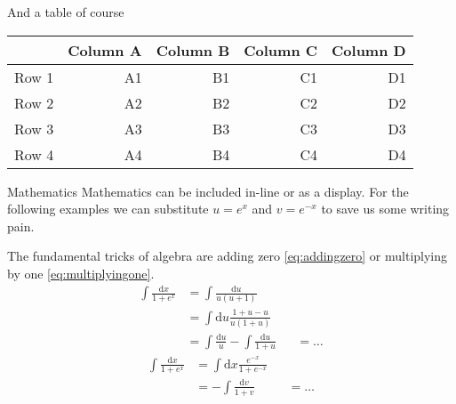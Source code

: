 \documentclass[final]{beamer}
\newcommand{\diff}{\mathrm{d}} %
\begin{document}
\begin{frame}[t]
\begin{multicols}{2}
\begin{block}{And a table of course}
    \begin{center}
      \begin{tabular}{lrrrr}
        \toprule
               & Column A & Column B & Column C & Column D  \\
        \midrule                                          
        Row 1  & A1       & B1       & C1       & D1        \\
        Row 2  & A2       & B2       & C2       & D2        \\
        Row 3  & A3       & B3       & C3       & D3        \\
        Row 4  & A4       & B4       & C4       & D4        \\
        \bottomrule
      \end{tabular}
    \end{center}
  \end{block}
  
  \begin{block}{Mathematics}
    Mathematics can be included in-line or as a display. 
    For the following examples we can substitute \(u=e^x\) and \(v=e^{-x}\) 
    to save us some writing pain.
    
    The fundamental tricks of algebra are adding zero \eqref{eq:addingzero} %
    or multiplying by one \eqref{eq:multiplyingone}.
    \begin{subequations}
      \begin{align}\label{eq:addingzero}
        \int \frac{\diff x}{1 + e^x} &= \int \frac{\diff u}{u (u + 1)}\\ 
          &= \int \diff u \frac{1 + u - u}{u (1 + u)} \\
          &= \int \frac{\diff u}{u} - \int \frac{\diff u}{1 + u}
          &&= \ldots
      \end{align}
    \end{subequations}
    \begin{subequations}
      \begin{align}\label{eq:multiplyingone}
        \int \frac{\diff x}{1 + e^x} &= \int \diff x \frac{e^{-x}}{1 + e^{-x}} \\
          &= -\int \frac{\diff v}{1 + v}
          &&= \ldots
      \end{align}
    \end{subequations}
  \end{block}


\end{multicols}
\end{frame}
\end{document}
